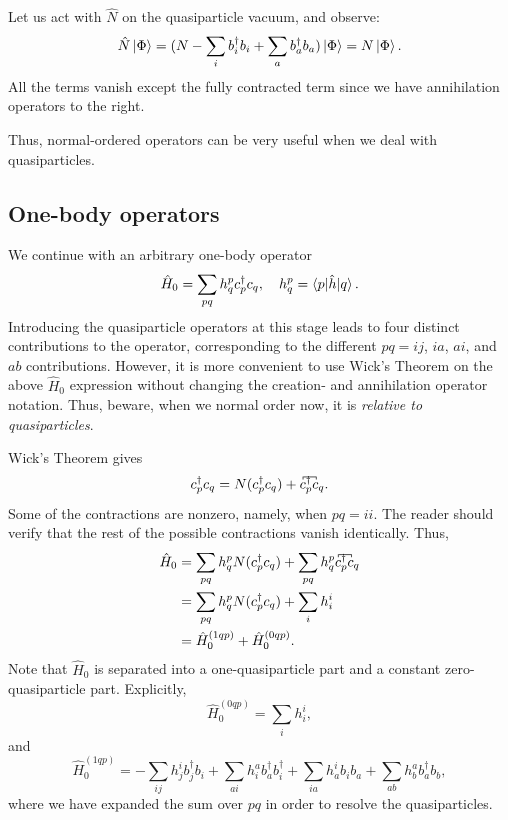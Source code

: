 \documentclass{report}
\theoremstyle{plain}
\theoremstyle{definition}
\begin{document}
Let us act with $\hat{N}$ on the quasiparticle vacuum, and observe:
\begin{equation}
  \hat{N}\ket{\Phi} = (N - \sum_i b^\dag_i b_i + \sum_a b^\dag_a
  b_a)\ket{\Phi} = N\ket{\Phi}.
\end{equation}
All the terms vanish except the fully contracted term since we have
annihilation operators to the right.

Thus, normal-ordered operators can be very useful when we deal with
quasiparticles. 

\subsection{One-body operators}

We continue with an arbitrary one-body operator
\begin{equation}
  \hat{H}_0 = \sum_{pq} h^p_q c^\dag_p c_q, \quad
  h^p_q = \braket{p|\hat{h}|q}.
\end{equation}
Introducing the quasiparticle operators at this stage leads to four
distinct contributions to the operator, corresponding to the different
$pq=ij$, $ia$, $ai$, and $ab$ contributions. However, it is more
convenient to use Wick's Theorem on the above $\hat{H}_0$ expression
without changing the creation- and annihilation operator
notation. Thus, beware, when we normal order now, it is \emph{relative
  to quasiparticles}.

Wick's Theorem gives
\begin{equation}
  c^\dag_p c_q = N(c^\dag_p c_q) +
  \contraction[.5ex]{}{c}{^{\dag}_p}{c} c^\dag_p c_q.
\end{equation}
Some of the contractions are nonzero, namely, when $pq=ii$. The reader
should verify that the rest of the possible contractions vanish
identically. 
Thus,
\begin{equation}
  \begin{split}
    \hat{H}_0 &= \sum_{pq} h^p_{q} N(c^\dag_p c_q) +
    \sum_{pq} h^p_{q} \contraction[.5ex]{}{c}{^{\dag}_p}{c}
    c^\dag_p c_q \\ & = \sum_{pq} h^p_{q} N(c^\dag_p c_q) +
    \sum_i h^i_{i} \\
    & = \hat{H}^{(1qp)}_0 + \hat{H}_0^{(0qp)}.\label{eq:normal-order-onebody-1}
  \end{split}
\end{equation}
Note that $\hat{H}_0$ is separated into a one-quasiparticle part and a
constant zero-quasiparticle part. Explicitly,
\begin{equation}
  \hat{H}_0^{(0qp)} = \sum_i h^i_i, 
\end{equation}
and
\begin{equation}
  \hat{H}_0^{(1qp)} = -\sum_{ij} h^i_{j} b^\dag_j b_i +
    \sum_{ai} h^a_{i} b^\dag_a b^\dag_i +
    \sum_{ia} h^i_{a} b_i b_a +
    \sum_{ab} h^a_{b} b^\dag_a b_b ,
\end{equation}
where we have expanded the sum over $pq$ in order to resolve the quasiparticles.
\end{document}
